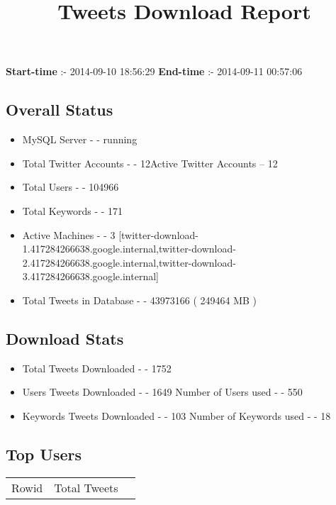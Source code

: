 \documentclass{article}\usepackage[T1]{fontenc}
\begin{document}
\title{\textbf{Tweets Download Report}}
               \date{}
                \maketitle
               \centerline{\textbf{Start-time} :- 2014-09-10 18:56:29 \hspace{40pt} \textbf{End-time} :- 2014-09-11 00:57:06}               \subsection*{Overall Status}                \begin{itemize}                \item MySQL Server - - running               \item Total Twitter Accounts - - 12\newline Active Twitter Accounts -- 12               \item Total Users - - 104966               \item Total Keywords - - 171               \item Active Machines - - 3 [twitter-download-1.417284266638.google.internal,twitter-download-2.417284266638.google.internal,twitter-download-3.417284266638.google.internal]               \item Total Tweets in Database - - 43973166 ( 249464 MB )               \end{itemize}               \subsection*{Download Stats}                \begin{itemize}                \item Total Tweets Downloaded - - 1752               \item Users Tweets Downloaded - - 1649 \newline Number of Users used - - 550               \item Keywords Tweets Downloaded - - 103 \newline Number of Keywords used - - 18              \end{itemize}              \subsection*{Top Users}\begin{tabular}{|c|c|c|}         \hline         Rowid & Total Tweets \\ 

\end{tabular}
\end{document}
